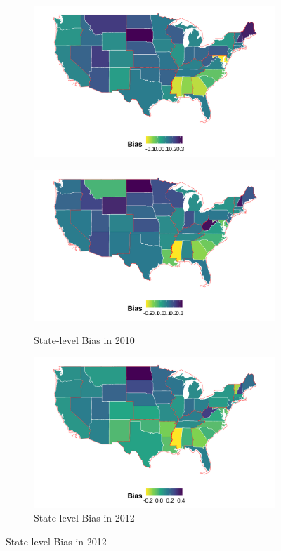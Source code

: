 \documentclass[12pt, fullpage]{article}
\begin{document}
\begin{center}
\begin{figure}[H]
\begin{subfigure}{.3\textwidth}
\includegraphics[width=\linewidth]{figure/2008skinmap.png} 
\label{fig:skiniat-map-2008}
\end{subfigure}
\hfill%
\begin{subfigure}{.3\textwidth}
\caption{State-level Bias in 2010}
\centering
\includegraphics[width=\linewidth]{figure/2010skinmap.png} 
\label{fig:skiniat-map-2010}
\end{subfigure}
\hfill%
\begin{subfigure}{.3\textwidth}
\caption{State-level Bias in 2012}
\centering
\includegraphics[width=\linewidth]{figure/2012skinmap.png} 

\end{subfigure}
\end{figure}
\end{center}
\end{document}
